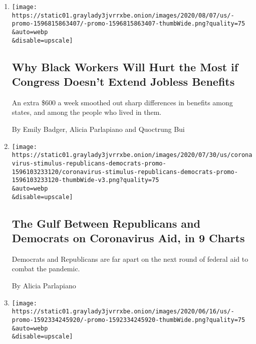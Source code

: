 \begin{enumerate}
\def\labelenumi{\arabic{enumi}.}
\item
  \href{/2020/08/07/upshot/unemployment-benefits-racial-disparity.html}{}

  \texttt{[image: https://static01.graylady3jvrrxbe.onion/images/2020/08/07/us/-promo-1596815863407/-promo-1596815863407-thumbWide.png?quality=75\\\&auto=webp\\\&disable=upscale]}

  \hypertarget{why-black-workers-will-hurt-the-most-if-congress-doesnt-extend-jobless-benefits}{%
  \subsection{Why Black Workers Will Hurt the Most if Congress Doesn't
  Extend Jobless
  Benefits}\label{why-black-workers-will-hurt-the-most-if-congress-doesnt-extend-jobless-benefits}}

  An extra \$600 a week smoothed out sharp differences in benefits among
  states, and among the people who lived in them.

  By Emily Badger, Alicia Parlapiano and Quoctrung Bui
\item
  \href{/interactive/2020/07/30/upshot/coronavirus-stimulus-bill.html}{}

  \texttt{[image: https://static01.graylady3jvrrxbe.onion/images/2020/07/30/us/coronavirus-stimulus-republicans-democrats-promo-1596103233120/coronavirus-stimulus-republicans-democrats-promo-1596103233120-thumbWide-v3.png?quality=75\\\&auto=webp\\\&disable=upscale]}

  \hypertarget{the-gulf-between-republicans-and-democrats-on-coronavirus-aid-in-9-charts}{%
  \subsection{The Gulf Between Republicans and Democrats on Coronavirus
  Aid, in 9
  Charts}\label{the-gulf-between-republicans-and-democrats-on-coronavirus-aid-in-9-charts}}

  Democrats and Republicans are far apart on the next round of federal
  aid to combat the pandemic.

  By Alicia Parlapiano
\item
  \href{/2020/06/17/upshot/coronavirus-spending-rich-poor.html}{}

  \texttt{[image: https://static01.graylady3jvrrxbe.onion/images/2020/06/16/us/-promo-1592334245920/-promo-1592334245920-thumbWide.png?quality=75\\\&auto=webp\\\&disable=upscale]}


\end{enumerate}
